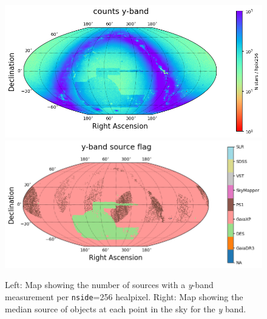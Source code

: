 \begin{figure}
    \includegraphics[width=0.48\linewidth]{./figures/source_density_maps/y-band_counts_full.png}
    \includegraphics[width=0.48\linewidth]{./figures/source_survey_maps/y-band_source.png}
    \caption{Left: Map showing the number of sources with a \textit{y}-band measurement per \texttt{nside}=256 healpixel.
    Right: Map showing the median source of objects at each point in the sky for the \textit{y} band.}
    \label{fig:monster-y}
\end{figure}